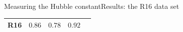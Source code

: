 \documentclass{beamer}
\def\wct#1{\textcolor{white}{#1}}
\newcommand{\NGC}{\mathrm{NGC4258}}
\begin{document}
\begin{frame}{Measuring the Hubble constant}{Results: the R16 data set}
{\begin{table}[tbp]
\begin{tabular}{@{}ccccc}
 R16 &  $ 0.86 $ & $ 0.78 $ & $0.92$  \\
  

\hline
\end{tabular}
\end{table}}



\end{frame}
\end{document}
